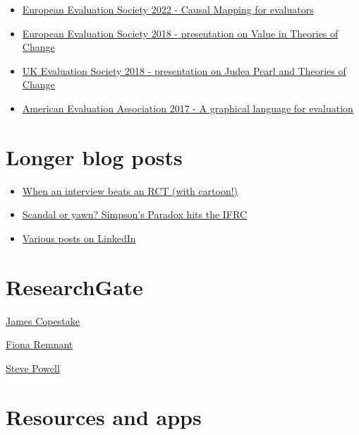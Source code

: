 \documentclass[
]{book}
\providecommand{\tightlist}{%
  \setlength{\itemsep}{0pt}\setlength{\parskip}{0pt}}
\begin{document}
\begin{itemize}
\tightlist
\item
  \href{https://drive.google.com/file/d/1nmSjMvGJYQTsm6-0hVZPfLbki1KEkJcB/view?usp=sharing}{European Evaluation Society 2022 - Causal Mapping for evaluators}
\item
  \href{https://drive.google.com/file/d/1FdiOs85iZCqZU6MdU3Lb5kgDOxq36G3b/view?usp=sharing}{European Evaluation Society 2018 - presentation on Value in Theories of Change}
\item
  \href{https://drive.google.com/file/d/1A2gIYmechpCot2QQc0TRWGlFg9r4jsz4/view?usp=sharing}{UK Evaluation Society 2018 - presentation on Judea Pearl and Theories of Change}
\item
  \href{http://comm.eval.org/viewdocument/theorymaker-a-graphical-language}{American Evaluation Association 2017 - A graphical language for evaluation}
\end{itemize}

\hypertarget{longer-blog-posts}{%
\section{Longer blog posts}\label{longer-blog-posts}}

\begin{itemize}
\tightlist
\item
  \href{http://www.pogol.net/public/article-evidence.html}{When an interview beats an RCT (with cartoon!)}
\item
  \href{http://www.pogol.net/_ideas/posts/2019-01-14-scandal-or-yawn-simpsons-paradox-hits-the-ifrc/}{Scandal or yawn? Simpson's Paradox hits the IFRC}
\item
  \href{https://www.linkedin.com/in/stevepowell99/detail/recent-activity/posts/}{Various posts on LinkedIn}
\end{itemize}

\hypertarget{researchgate}{%
\section{ResearchGate}\label{researchgate}}

\href{https://www.researchgate.net/profile/James_Copestake}{James Copestake}

\href{https://www.researchgate.net/profile/Fiona_Remnant}{Fiona Remnant}

\href{https://www.researchgate.net/profile/Steve_Powell2}{Steve Powell}

\hypertarget{resources-and-apps}{%
\section{Resources and apps}\label{resources-and-apps}}
\end{document}
